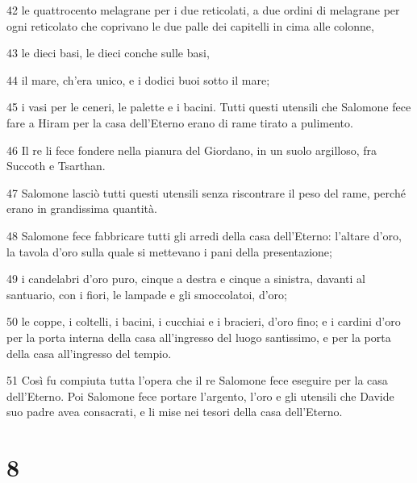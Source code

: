 \par 42 le quattrocento melagrane per i due reticolati, a due ordini di melagrane per ogni reticolato che coprivano le due palle dei capitelli in cima alle colonne,
\par 43 le dieci basi, le dieci conche sulle basi,
\par 44 il mare, ch'era unico, e i dodici buoi sotto il mare;
\par 45 i vasi per le ceneri, le palette e i bacini. Tutti questi utensili che Salomone fece fare a Hiram per la casa dell'Eterno erano di rame tirato a pulimento.
\par 46 Il re li fece fondere nella pianura del Giordano, in un suolo argilloso, fra Succoth e Tsarthan.
\par 47 Salomone lasciò tutti questi utensili senza riscontrare il peso del rame, perché erano in grandissima quantità.
\par 48 Salomone fece fabbricare tutti gli arredi della casa dell'Eterno: l'altare d'oro, la tavola d'oro sulla quale si mettevano i pani della presentazione;
\par 49 i candelabri d'oro puro, cinque a destra e cinque a sinistra, davanti al santuario, con i fiori, le lampade e gli smoccolatoi, d'oro;
\par 50 le coppe, i coltelli, i bacini, i cucchiai e i bracieri, d'oro fino; e i cardini d'oro per la porta interna della casa all'ingresso del luogo santissimo, e per la porta della casa all'ingresso del tempio.
\par 51 Così fu compiuta tutta l'opera che il re Salomone fece eseguire per la casa dell'Eterno. Poi Salomone fece portare l'argento, l'oro e gli utensili che Davide suo padre avea consacrati, e li mise nei tesori della casa dell'Eterno.

\chapter{8}


